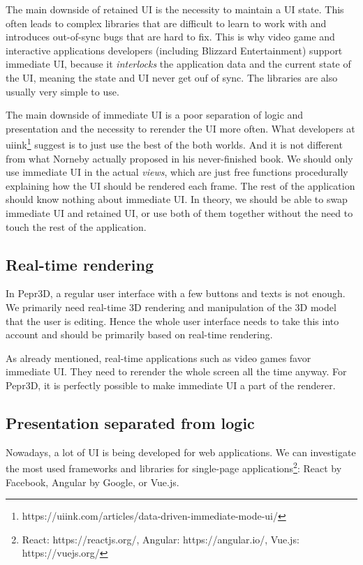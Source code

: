 The main downside of retained UI is the necessity to maintain a UI state.
This often leads to complex libraries that are difficult to learn to work with and introduces out-of-sync bugs that are hard to fix.
This is why video game and interactive applications developers (including Blizzard Entertainment) support immediate UI, because it \emph{interlocks} the application data and the current state of the UI, meaning the state and UI never get ouf of sync.
The libraries are also usually very simple to use.

The main downside of immediate UI is a poor separation of logic and presentation and the necessity to rerender the UI more often.
What developers at uiink\footnote{https://uiink.com/articles/data-driven-immediate-mode-ui/} suggest is to just use the best of the both worlds.
And it is not different from what Norneby actually proposed in his never-finished book.
We should only use immediate UI in the actual \emph{views}, which are just free functions procedurally explaining how the UI should be rendered each frame.
The rest of the application should know nothing about immediate UI.
In theory, we should be able to swap immediate UI and retained UI, or use both of them together without the need to touch the rest of the application.

\subsection{Real-time rendering}

In Pepr3D, a regular user interface with a few buttons and texts is not enough.
We primarily need real-time 3D rendering and manipulation of the 3D model that the user is editing.
Hence the whole user interface needs to take this into account and should be primarily based on real-time rendering.

As already mentioned, real-time applications such as video games favor immediate UI.
They need to rerender the whole screen all the time anyway.
For Pepr3D, it is perfectly possible to make immediate UI a part of the renderer.

\subsection{Presentation separated from logic}

Nowadays, a lot of UI is being developed for web applications.
We can investigate the most used frameworks and libraries for single-page applications\footnote{React: https://reactjs.org/, Angular: https://angular.io/, Vue.js: https://vuejs.org/}: React by Facebook, Angular by Google, or Vue.js.

